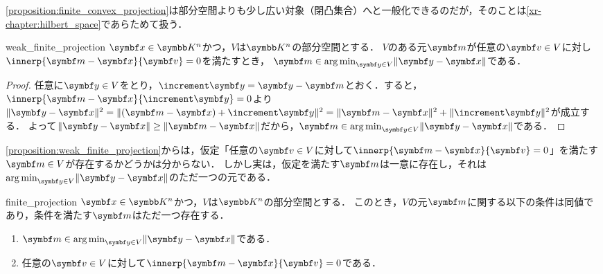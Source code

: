 \documentclass[../../main]{subfiles}
\begin{document}
\begin{note}
  \cref{proposition:finite_convex_projection}は部分空間よりも少し広い対象（閉凸集合）へと一般化できるのだが，そのことは\cref{xr-chapter:hilbert_space}であらためて扱う．  
\end{note}

\begin{proposition}{}{weak_finite_projection}
  \(\vect{x}\in\numset{K}^n\)かつ，\(V\)は\(\numset{K}^n\)の部分空間とする．
  \(V\)のある元\(\vect{m}\)が任意の\(\vect{v}\in V\)に対し\(\innerp{\vect{m}-\vect{x}}{\vect{v}}=0\)を満たすとき，
  \(\vect{m}\in\argmin_{\vect{y}\in V}\vnorm{\vect{y}-\vect{x}}\)である．
\end{proposition}

\begin{proof}
  任意に\(\vect{y}\in V\)をとり，\(\increment\vect{y}=\vect{y}-\vect{m}\)とおく．すると，\(\innerp{\vect{m}-\vect{x}}{\increment\vect{y}}=0\)より
  \(\vnorm{\vect{y}-\vect{x}}^2=\vnorm{(\vect{m}-\vect{x})+\increment\vect{y}}^2=\vnorm{\vect{m}-\vect{x}}^2+\vnorm{\increment\vect{y}}^2\)が成立する．
  よって\(\vnorm{\vect{y}-\vect{x}}\geq\vnorm{\vect{m}-\vect{x}}\)だから，\(\vect{m}\in\argmin_{\vect{y}\in V}\vnorm{\vect{y}-\vect{x}}\)である．
\end{proof}

\cref{proposition:weak_finite_projection}からは，仮定「任意の\(\vect{v}\in V\)に対して\(\innerp{\vect{m}-\vect{x}}{\vect{v}}=0\)」を満たす\(\vect{m}\in V\)が存在するかどうかは分からない．
しかし実は，仮定を満たす\(\vect{m}\)は一意に存在し，それは\(\argmin_{\vect{y}\in V}\vnorm{\vect{y}-\vect{x}}\)のただ一つの元である．

\begin{proposition}{}{finite_projection}
  \(\vect{x}\in\numset{K}^n\)かつ，\(V\)は\(\numset{K}^n\)の部分空間とする．
  このとき，\(V\)の元\(\vect{m}\)に関する以下の条件は同値であり，条件を満たす\(\vect{m}\)はただ一つ存在する．
  \begin{enumerate}
    \item \(\vect{m}\in\argmin_{\vect{y}\in V}\vnorm{\vect{y}-\vect{x}}\)である．
    \item 任意の\(\vect{v}\in V\)に対して\(\innerp{\vect{m}-\vect{x}}{\vect{v}}=0\)である．
  \end{enumerate}
\end{proposition}
\end{document}
